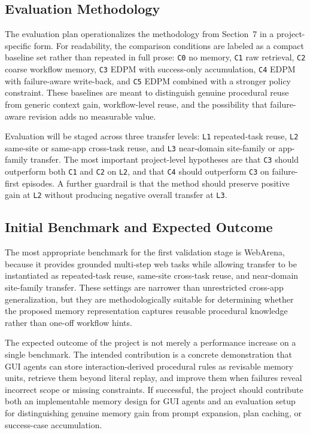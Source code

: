 \documentclass{article}
\begin{document}
\subsection{Evaluation Methodology}\label{84-evaluation-methodology}

The evaluation plan operationalizes the methodology from Section~7 in a
project-specific form. For readability, the comparison conditions are
labeled as a compact baseline set rather than repeated in full prose:
\texttt{C0} no memory, \texttt{C1} raw retrieval,
\texttt{C2} coarse workflow memory, \texttt{C3} EDPM with success-only
accumulation, \texttt{C4} EDPM with failure-aware write-back, and
\texttt{C5} EDPM combined with a stronger policy constraint. These
baselines are meant to distinguish genuine procedural reuse from generic
context gain, workflow-level reuse, and the possibility that
failure-aware revision adds no measurable value.

Evaluation will be staged across three transfer levels: \texttt{L1}
repeated-task reuse, \texttt{L2} same-site or same-app cross-task reuse,
and \texttt{L3} near-domain site-family or app-family transfer. The most
important project-level hypotheses are that \texttt{C3} should
outperform both \texttt{C1} and \texttt{C2} on \texttt{L2}, and that
\texttt{C4} should outperform \texttt{C3} on failure-first episodes. A
further guardrail is that the method should preserve positive gain at
\texttt{L2} without producing negative overall transfer at
\texttt{L3}.

\subsection{Initial Benchmark and Expected Outcome}\label{85-initial-benchmark-and-expected-outcome}

The most appropriate benchmark for the first validation stage is
WebArena, because it provides grounded multi-step web tasks while
allowing transfer to be instantiated as repeated-task reuse, same-site
cross-task reuse, and near-domain site-family transfer. These settings
are narrower than unrestricted cross-app generalization, but they are
methodologically suitable for determining whether the proposed memory
representation captures reusable procedural knowledge rather than one-off
workflow hints.

The expected outcome of the project is not merely a performance increase
on a single benchmark. The intended contribution is a concrete
demonstration that GUI agents can store interaction-derived procedural
rules as revisable memory units, retrieve them beyond literal replay,
and improve them when failures reveal incorrect scope or missing
constraints. If successful, the project should contribute both an
implementable memory design for GUI agents and an evaluation setup for
distinguishing genuine memory gain from prompt expansion, plan caching,
or success-case accumulation.
\end{document}
